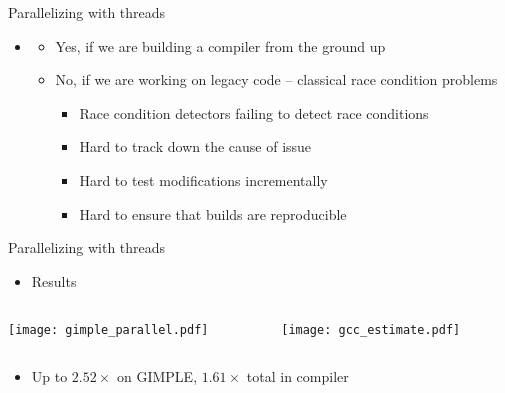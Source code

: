 
\begin{frame}{Parallelizing with threads}

\begin{itemize}
    \item 
    \begin{itemize}
        \item Yes, if we are building a compiler from the ground up
        \item No, if we are working on legacy code -- classical race condition problems
        \begin{itemize}
            \item Race condition detectors failing to detect race conditions
            \item Hard to track down the cause of issue
            \item Hard to test modifications incrementally
            \item Hard to ensure that builds are reproducible
        \end{itemize}
    \end{itemize}
\end{itemize}
\end{frame}


\begin{frame}{Parallelizing with threads}

\begin{itemize}
    \item Results
\end{itemize}
\begin{columns}
\begin{column}{0.5\textwidth}
 \texttt{[image: gimple\_parallel.pdf]}
\end{column}
\begin{column}{0.5\textwidth}
 \texttt{[image: gcc\_estimate.pdf]}
\end{column}
\end{columns}
\begin{itemize}
    \item Up to $2.52\times$ on GIMPLE, $1.61\times$ total in compiler
\end{itemize}

\end{frame}

